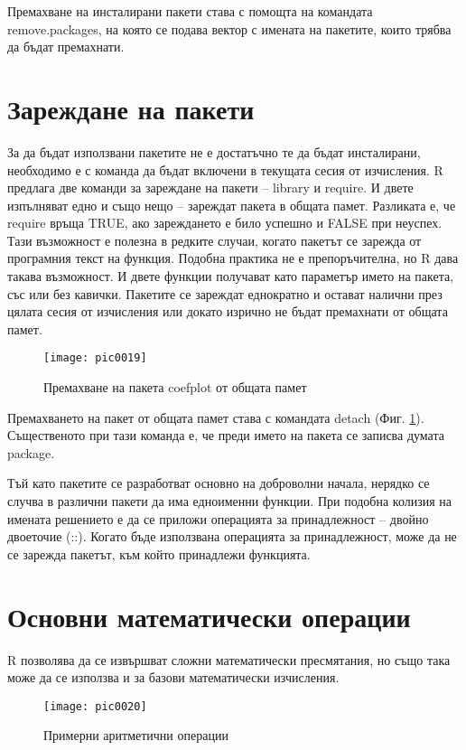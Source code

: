 Премахване на инсталирани пакети става с помощта на командата remove.packages, на която се подава вектор с имената на пакетите, които трябва да бъдат премахнати.

\section{Зареждане на пакети}

За да бъдат използвани пакетите не е достатъчно те да бъдат инсталирани, необходимо е с команда да бъдат включени в текущата сесия от изчисления. R предлага две команди за зареждане на пакети – library и require. И двете изпълняват едно и също нещо – зареждат пакета в общата памет. Разликата е, че require връща TRUE, ако зареждането е било успешно и FALSE при неуспех. Тази възможност е полезна в редките случаи, когато пакетът се зарежда от програмния текст на функция. Подобна практика не е препоръчителна, но R дава такава възможност. И двете функции получават като параметър името на пакета, със или без кавички. Пакетите се зареждат еднократно и остават налични през цялата сесия от изчисления или докато изрично не бъдат премахнати от общата памет.

\begin{figure}[h!]
  \centering
  \texttt{[image: pic0019]}
  \caption{Премахване на пакета coefplot от общата памет}
\label{figure0019}
\end{figure}
\FloatBarrier

Премахването на пакет от общата памет става с командата detach (Фиг. \ref{figure0019}). Същественото при тази команда е, че преди името на пакета се записва думата package.

Тъй като пакетите се разработват основно на доброволни начала, нерядко се случва в различни пакети да има едноименни функции. При подобна колизия на имената решението е да се приложи операцията за принадлежност – двойно двоеточие (::). Когато бъде използвана операцията за принадлежност,  може да не се зарежда пакетът, към който принадлежи функцията.

\section{Основни математически операции}

R позволява да се извършват сложни математически пресмятания, но също така може да се използва и за базови математически изчисления. 

\begin{figure}[h!]
  \centering
  \texttt{[image: pic0020]}
  \caption{Примерни аритметични операции}
\label{figure0020}
\end{figure}
\FloatBarrier

